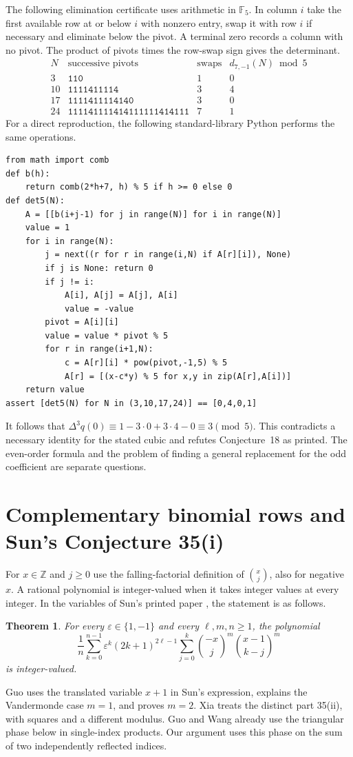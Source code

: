 \documentclass[11pt,a4paper]{article}
\newtheorem{theorem}{Theorem}[section]\newtheorem{lemma}[theorem]{Lemma}
\theoremstyle{definition}\newtheorem{problem}[theorem]{Auxiliary problem}
\theoremstyle{remark}\newtheorem*{remark}{Remark}
\begin{document}
The following elimination certificate uses arithmetic in $\mathbb F_5$.
In column $i$ take the first available row at or below $i$ with
nonzero entry, swap it with row $i$ if necessary and eliminate below
the pivot. A terminal zero records a column with no pivot.
The product of pivots times the row-swap sign gives the determinant.
\[
\begin{array}{r|l|r|r}
N&\text{successive pivots}&\text{swaps}& d_{7,-1}(N)\bmod 5\\\hline
3  &\mathtt{110}&1&0\\
10 &\mathtt{1111411114}&3&4\\
17 &\mathtt{1111411114140}&3&0\\
24 &\mathtt{111141111414111111414111}&7&1
\end{array}
\]
For a direct reproduction, the following standard-library Python
performs the same operations.
\begin{verbatim}
from math import comb
def b(h):
    return comb(2*h+7, h) % 5 if h >= 0 else 0
def det5(N):
    A = [[b(i+j-1) for j in range(N)] for i in range(N)]
    value = 1
    for i in range(N):
        j = next((r for r in range(i,N) if A[r][i]), None)
        if j is None: return 0
        if j != i:
            A[i], A[j] = A[j], A[i]
            value = -value
        pivot = A[i][i]
        value = value * pivot % 5
        for r in range(i+1,N):
            c = A[r][i] * pow(pivot,-1,5) % 5
            A[r] = [(x-c*y) % 5 for x,y in zip(A[r],A[i])]
    return value
assert [det5(N) for N in (3,10,17,24)] == [0,4,0,1]
\end{verbatim}
It follows that $\Delta^3q(0)\equiv1-3\cdot0+3\cdot4-0
\equiv3\pmod5$. This contradicts a necessary identity for the stated
cubic and refutes Conjecture~18 as printed. The even-order formula and
the problem of finding a general replacement for the odd coefficient
are separate questions.


\section{Complementary binomial rows and Sun's Conjecture 35(i)}
For $x\in\mathbb Z$ and $j\ge0$ use the falling-factorial definition of $\binom{x}{j}$, also for negative $x$. A rational polynomial is integer-valued when it takes integer values at every integer. In the variables of Sun's printed paper \cite[Conjecture 35(i)]{Sun}, the statement is as follows.
\begin{theorem}\label{thm:sun}
For every $\varepsilon\in\{1,-1\}$ and every $\ell,m,n\ge1$, the polynomial
\[
 \frac1n\sum_{k=0}^{n-1}\varepsilon^k(2k+1)^{2\ell-1}
       \sum_{j=0}^k\binom{-x}{j}^{m}\binom{x-1}{k-j}^{m}
\]
is integer-valued.
\end{theorem}
Guo \cite{Guo} uses the translated variable $x+1$ in Sun's expression, explains the Vandermonde case $m=1$, and proves $m=2$. Xia \cite{Xia} treats the distinct part 35(ii), with squares and a different modulus. Guo and Wang \cite{GW} already use the triangular phase below in single-index products. Our argument uses this phase on the sum of two independently reflected indices.
\end{document}
